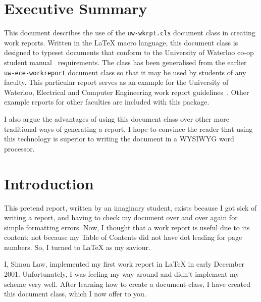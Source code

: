 \documentclass{uw-wkrpt}
\begin{document}
\section*{Executive Summary}
{}

\setcounter{page}{3}

This document describes the use of the \texttt{uw-wkrpt.cls}
document class in creating work reports.  Written in the 
\LaTeX{} macro language, this document class is designed to typeset 
documents that conform to the University of Waterloo co-op student 
manual~\cite{ref:coopman} requirements.  The class has been generalised
from the earlier \texttt{uw-ece-workreport} document class so that it
may be used by students of any faculty.  This particular report 
serves as an example for the University of Waterloo, Electrical and 
Computer Engineering work report guidelines~\cite{ref:eceguidelines}.  
Other example reports for other faculties are included with this package.

I also argue the advantages of using this document class over other
more traditional ways of generating a report.  I hope to convince the
reader that using this technology is superior to writing the document
in a WYSIWYG word processor.

\clearpage
\tableofcontents
\clearpage
\listoffigures
\clearpage
\listoftables

\clearpage
{}
\onehalfspacing

\section{Introduction}\label{sec:intro}
This pretend report, written by an imaginary student,
exists because I got sick of writing a report,
and having to check my document over and over again for simple
formatting errors.  Now, I thought that a work report is useful
due to its content; not because my Table of Contents did not have dot
leading for page numbers.  So, I turned to \LaTeX{} as my saviour.

I, Simon Law, implemented my first work report in \LaTeX{} in early
December 2001.  Unfortunately, I was feeling my way around and didn't
implement my scheme very well.  After learning how to create a
document class, I have created this document class, which I now offer 
to you.
\end{document}
